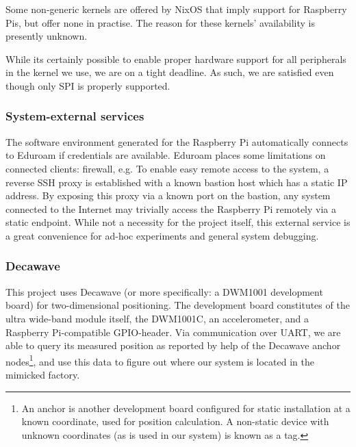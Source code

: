 Some non-generic kernels are offered by NixOS that imply support for Raspberry Pis, but offer none in practise.
The reason for these kernels' availability is presently unknown.

While its certainly possible to enable proper hardware support for all peripherals in the kernel we use, we are on a tight deadline.
As such, we are satisfied even though only SPI is properly supported.


\subsubsection{System-external services}
The software environment generated for the Raspberry Pi automatically connects to Eduroam if credentials are available.
Eduroam places some limitations on connected clients: firewall, e.g.
To enable easy remote access to the system, a reverse SSH proxy is established with a known bastion host which has a static IP address.
By exposing this proxy via a known port on the bastion, any system connected to the Internet may trivially access the Raspberry Pi remotely via a static endpoint.
While not a necessity for the project itself, this external service is a great convenience for ad-hoc experiments and general system debugging.



\subsubsection{Decawave}
This project uses Decawave (or more specifically: a DWM1001 development board) for two-dimensional positioning.
The development board constitutes of the ultra wide-band module itself, the DWM1001C, an accelerometer,
and a Raspberry Pi-compatible GPIO-header.
Via communication over UART, we are able to query its measured position as reported by help of the Decawave anchor nodes\footnote{An anchor is another development board configured for static installation at a known coordinate, used for position calculation. A non-static device with unknown coordinates (as is used in our system) is known as a tag.},
and use this data to figure out where our system is located in the mimicked factory.

